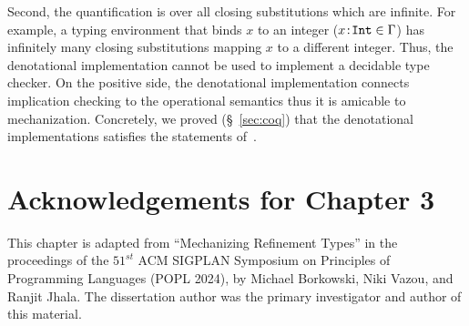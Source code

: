 Second, the quantification is over all closing substitutions
which are infinite. For example, 
a typing environment that binds $x$ to an integer 
(\ie ${{x}\!:\!{\texttt{Int}}}\in \mathrm{\Gamma}$) 
has infinitely many closing substitutions mapping $x$ to a different 
integer. Thus, the denotational implementation 
cannot be used to implement a decidable type checker. 
%
On the positive side, the denotational implementation
connects implication checking to the operational semantics
thus it is amicable to mechanization.
Concretely, we proved (\S~\ref{sec:coq})
that the denotational implementations satisfies 
the statements of~. 

\section*{Acknowledgements for Chapter 3}
%
This chapter is adapted from 
``Mechanizing Refinement Types'' in the proceedings of the 
$51^{st}$ ACM SIGPLAN Symposium on Principles of Programming
Languages (POPL 2024), by Michael Borkowski, Niki Vazou, and
Ranjit Jhala.
%
The dissertation author was the primary investigator 
and author of this material.